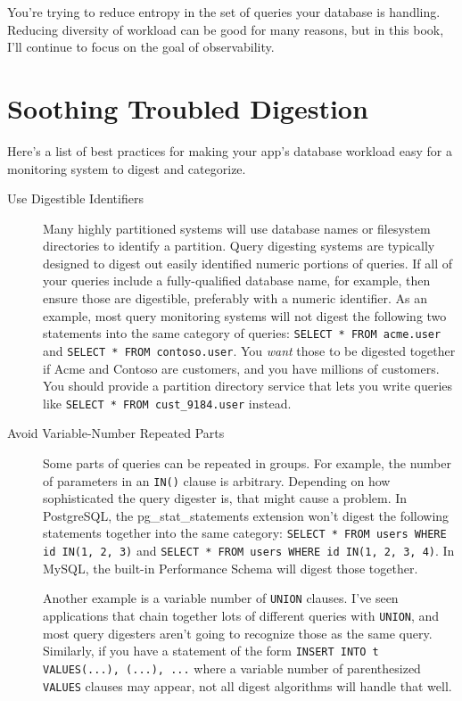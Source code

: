 \documentclass{vivid_layout}
\begin{document}
You're trying to reduce entropy in the set of queries
your database is handling. Reducing diversity of workload can be good
for many reasons, but in this book, I'll continue to focus on the goal of
observability.

\section{Soothing Troubled Digestion}

Here's a list of best practices for making your app's
database workload easy for a monitoring system to digest and categorize.

\begin{description}

\item[Use Digestible Identifiers] Many highly partitioned systems will use
database names or filesystem directories to identify a partition. Query
digesting systems are typically designed to digest out easily identified numeric
portions of queries. If all of your queries include a fully-qualified database
name, for example, then ensure those are digestible, preferably with a numeric
identifier. As an example, most query monitoring systems will not digest the
following two statements into the same category of queries: \texttt{SELECT *
FROM acme.user} and \texttt{SELECT * FROM contoso.user}. You \emph{want}
those to be digested together if Acme and Contoso are customers, and you
have millions of customers. You should provide a partition directory service
that lets you write queries like \texttt{SELECT * FROM cust\_9184.user} instead.

\item[Avoid Variable-Number Repeated Parts] Some parts of queries can be
repeated in groups. For example, the number of parameters in an \texttt{IN()}
clause is arbitrary. Depending on how sophisticated the query digester is, that
might cause a problem. In PostgreSQL, the pg\_stat\_statements extension won't
digest the following statements together into the same category: 
\texttt{SELECT * FROM users WHERE id IN(1, 2, 3)} and
\texttt{SELECT * FROM users WHERE id IN(1, 2, 3, 4)}. In MySQL, the built-in
Performance Schema will digest those together.

Another example is a variable number of \texttt{UNION} clauses. I've seen
applications that chain together lots of different queries with \texttt{UNION},
and most query digesters aren't going to recognize those as the same query.
Similarly, if you have a statement of the form \texttt{INSERT INTO t
VALUES(...), (...), ...} where a variable number of parenthesized
\texttt{VALUES} clauses may appear, not all digest algorithms will handle that
well.


\end{description}
\end{document}
